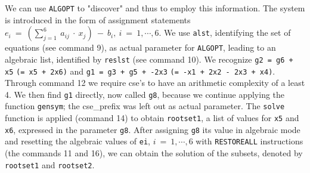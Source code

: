 We can use {\tt ALGOPT} to "discover" and thus to employ this information.
The system is introduced in the form of assignment statements
  $e_i~=~(\sum_{j=1}^{6}~a_{ij}~\cdot~x_{j})~-~b_{i},~i~=~1, \cdots ,6$.
We use {\tt alst}, identifying the set of equations (see command 9),
as actual parameter for {\tt ALGOPT}, leading to an algebraic list,
identified by {\tt reslst} (see command 10). We recognize {\tt g2 = g6 + x5}
{\tt (= x5 + 2x6)} and {\tt g1 = g3 + g5 + -2x3} {\tt (= -x1 + 2x2 - 2x3 + x4)}.
Through command 12 we require
cse's to have an arithmetic complexity of a least 4. We then find {\tt g1}
directly, now called {\tt g8}, because we continue applying the
function {\tt gensym}; the cse\_prefix was left out as actual parameter.
The {\tt solve} function is applied (command 14) to obtain {\tt rootset1}, a list
of values for {\tt x5} and {\tt x6}, expressed in the parameter {\tt g8}.
After assigning {\tt g8} its value in algebraic mode and
resetting the algebraic values of {\tt ei}, $i~=~ 1, \cdots ,6$
with {\tt RESTOREALL} instructions (the commands 11 and 16),
we can obtain the solution
of the subsets, denoted by {\tt rootset1} and {\tt rootset2}.
